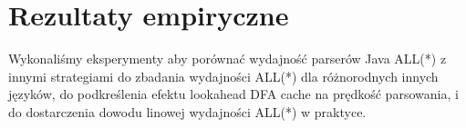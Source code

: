 \section{Rezultaty empiryczne}
Wykonaliśmy eksperymenty aby porównać wydajność parserów Java ALL(*) z
innymi strategiami do zbadania wydajności ALL(*) dla różnorodnych innych języków,
do podkreślenia efektu lookahead DFA cache na prędkość parsowania, i do dostarczenia
dowodu linowej wydajności ALL(*) w praktyce.
